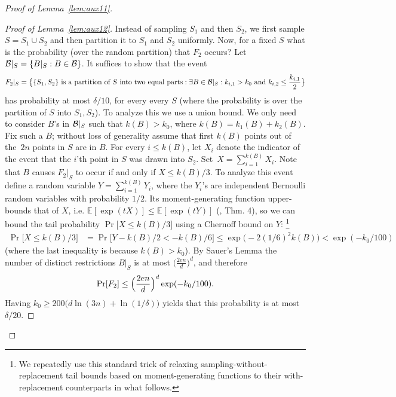 \documentclass{article}
\newcommand{\B}{{\cal B}}
\newcommand{\evp}[2]{\mathbb{E}_{#2} \left[#1\right]} %
\newcommand{\samp}{S}
\newcommand{\comment}[3]{\marginpar{\textcolor{#2}{#1: #3}}}
\newcommand{\shay}[1]{\comment{Shay}{red}{#1}}
\newcommand{\yoav}[1]{\comment{Yoav}{blue}{#1}}
\newcommand{\akshay}[1]{\comment{Akshay}{orange}{#1}}
\begin{document}
\begin{proof}[Proof of Lemma~\ref{lem:aux11}]
\begin{proof}[Proof of Lemma~\ref{lem:aux12}]
Instead of sampling $\samp_1$ and then $\samp_2$,
we first sample $\samp=\samp_1\cup \samp_2$ and 
then partition it to $\samp_1$ and $\samp_2$ uniformly.
Now, for a fixed $\samp$ what is the probability (over the random partition)
that $F_2$ occurs?
Let $\B|_{\samp} = \{B|_{\samp} : B\in\B\}$.
It suffices to show that the event
\[F_2|_{\samp} = 
\bigl\{ \{S_1,S_2\}\text{ is a partition of $S$ into two equal parts} :
\exists {B\in\B|_{\samp}}:
  k_{i,1}>k_0 \mbox{ and } k_{i,2} \leq \frac{k_{i,1}}{2}
  \bigr\}
\]
has probability at most $\delta/10$, for every every $\samp$ 
(where the probability is over the partition of $\samp$ into $\samp_1,\samp_2$).
To analyze this we use a union bound. 
We only need to consider $B$'s in $\B|_{\samp}$ such that $k(B) > k_0$,
where $k(B) = k_{1}(B)+ k_{2}(B)$.
Fix such a $B$;
without loss of generality assume that
first $k(B)$ points out of the~$2n$
points in $S$ are in $B$. 
For every $i\leq k(B)$,
let $X_i$ denote the indicator of the event
that the $i$'th point in $S$ was drawn into $S_2$.
Set~$X=\sum_{i=1}^{k(B)}X_i$.
Note that $B$ causes $F_2|_{\samp}$ to occur if and only if $X\leq k(B)/3$.
To analyze this event define a random variable $Y=\sum_{i=1}^{k(B)}Y_i$,
where the $Y_i$'s are independent Bernoulli random variables with probability $1/2$. 
Its moment-generating function upper-bounds that of $X$, i.e. $\evp{\exp(tX)}{} \leq \evp{\exp(tY)}{}$ 
(\cite{H63}, Thm. 4), 
so we can bound the tail probability $\Pr\bigl[X\leq k(B)/3\bigr]$ using a Chernoff bound on $Y$:
\footnote{We repeatedly use this standard trick of relaxing sampling-without-replacement tail bounds based on moment-generating functions to their with-replacement counterparts in what follows.} 
\yoav{Akshay, I can see how this argument works for a single ball $B$,
  but not how it would work for a uniform bound over a set of balls.}
\akshay{Yoav, where is the issue? I believe the proof from the line ``Fix such a $B$" (before this comment inline) to ``By Sauer's Lemma" is for a fixed $B$, then the standard uniform bound applies over the Sauer class $B\mid_S$. And similarly for the other applications of Chernoff to without-replacement in this writeup.}
\shay{Here we should refer to the statement that sampling without repetitions is more concentrated.}
\yoav{This comment by shay appears verbatim in three different
  places. Should all of them be there? (instead of uncommenting
  comments, change the newcommands that create them).}
\begin{align*}
\Pr\bigl[X\leq k(B)/3\bigr]
&=\Pr\bigl[Y- k(B)/2 < -k(B)/6\bigr]\leq
\exp\bigl(-2(1/6)^2k(B)\bigr) < \exp(-k_0/100)
\end{align*}
(where the last inequality is because $k(B) > k_0$).
By Sauer's Lemma
the number of distinct restrictions $B|_S$ is at most $\bigl(\frac{2en}{d}\bigr)^d$, and therefore 
\[\Pr[F_2]\leq \Bigl(\frac{2en}{d}\Bigr)^d\exp(-k_0/100).\]
Having $k_0\geq 200\bigl(d\ln(3n) + \ln(1/\delta) \bigr)$ yields
that this probability is at most $\delta/20$.
\end{proof}


\end{proof}
\end{document}

